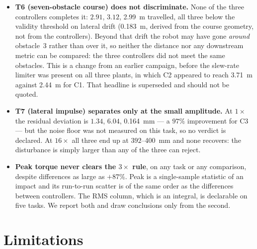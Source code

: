 \documentclass[11pt,a4paper]{article}
\newcommand{\Co}{\textsf{C1}}
\newcommand{\Ct}{\textsf{C2}}
\newcommand{\Cth}{\textsf{C3}}
\begin{document}
\begin{itemize}
\item \textbf{T6 (seven-obstacle course) does not discriminate.} None of the
three controllers completes it: $2.91$, $3.12$, \SI{2.99}{\meter} travelled,
all three below the validity threshold on lateral drift
(\SI{0.183}{\meter}, derived from the course geometry, not from the
controllers). Beyond that drift the robot may have gone \emph{around}
obstacle~3 rather than over it, so neither the distance nor any downstream
metric can be compared: the three controllers did not meet the same obstacles.
This is a change from an earlier campaign, before the slew-rate limiter was
present on all three plants, in which \Ct{} appeared to reach \SI{3.71}{\meter}
against \SI{2.44}{\meter} for \Co. That headline is superseded and should not
be quoted.

\item \textbf{T7 (lateral impulse) separates only at the small amplitude.} At
$1\times$ the residual deviation is $1.34$, $6.04$, \SI{0.164}{\milli\meter}
--- a $97\%$ improvement for \Cth{} --- but the noise floor was not measured on
this task, so no verdict is declared. At $16\times$ all three end up at
$392$--\SI{400}{\milli\meter} and none recovers: the disturbance is simply
larger than any of the three can reject.

\item \textbf{Peak torque never clears the $3\times$ rule}, on any task or any
comparison, despite differences as large as $+87\%$. Peak is a single-sample
statistic of an impact and its run-to-run scatter is of the same order as the
differences between controllers. The RMS column, which is an integral, is
declarable on five tasks. We report both and draw conclusions only from the
second.
\end{itemize}

\section{Limitations}
\label{sec:limits}
\end{document}

